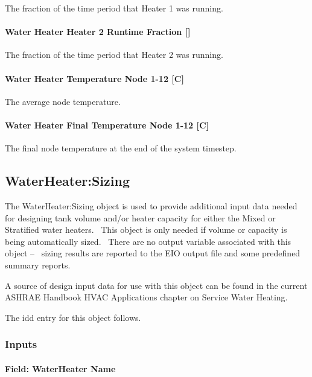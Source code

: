 The fraction of the time period that Heater 1 was running.

\paragraph{Water Heater Heater 2 Runtime Fraction {[]}}\label{water-heater-heater-2-runtime-fraction}

The fraction of the time period that Heater 2 was running.

\paragraph{Water Heater Temperature Node 1-12 {[}C{]}}\label{water-heater-temperature-node-1-12-c}

The average node temperature.

\paragraph{Water Heater Final Temperature Node 1-12 {[}C{]}}\label{water-heater-final-temperature-node-1-12-c}

The final node temperature at the end of the system timestep.

\subsection{WaterHeater:Sizing}\label{waterheatersizing}

The WaterHeater:Sizing object is used to provide additional input data needed for designing tank volume and/or heater capacity for either the Mixed or Stratified water heaters.~ This object is only needed if volume or capacity is being automatically sized.~ There are no output variable associated with this object --~ sizing results are reported to the EIO output file and some predefined summary reports.

A source of design input data for use with this object can be found in the current ASHRAE Handbook HVAC Applications chapter on Service Water Heating.

The idd entry for this object follows.

\subsubsection{Inputs}\label{inputs-2-045}

\paragraph{Field: WaterHeater Name}\label{field-waterheater-name}

